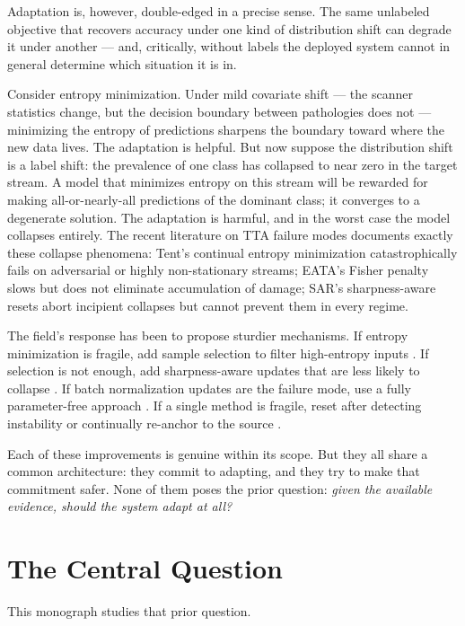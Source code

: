 Adaptation is, however, double-edged in a precise sense.
The same unlabeled objective that recovers accuracy under one kind of
distribution shift can degrade it under another --- and, critically, without
labels the deployed system cannot in general determine which situation it is in.

Consider entropy minimization.
Under mild covariate shift --- the scanner statistics change, but the
decision boundary between pathologies does not --- minimizing the entropy of
predictions sharpens the boundary toward where the new data lives.
The adaptation is helpful.
But now suppose the distribution shift is a label shift: the prevalence of
one class has collapsed to near zero in the target stream.
A model that minimizes entropy on this stream will be rewarded for making
all-or-nearly-all predictions of the dominant class; it converges to a
degenerate solution.
The adaptation is harmful, and in the worst case the model collapses
entirely.
The recent literature on TTA failure modes \cite{zhao2023pitfalls,
press2023rdumb, niu2023sar} documents exactly these collapse phenomena:
Tent's continual entropy minimization catastrophically fails on adversarial
or highly non-stationary streams; EATA's Fisher penalty slows but does not
eliminate accumulation of damage; SAR's sharpness-aware resets abort
incipient collapses but cannot prevent them in every regime.

The field's response has been to propose sturdier mechanisms.
If entropy minimization is fragile, add sample selection to filter
high-entropy inputs \cite{niu2022eata}.
If selection is not enough, add sharpness-aware updates that are less
likely to collapse \cite{niu2023sar}.
If batch normalization updates are the failure mode, use a fully
parameter-free approach \cite{boudiaf2022lame}.
If a single method is fragile, reset after detecting instability
\cite{niu2023sar} or continually re-anchor to the source
\cite{wang2022cotta}.

Each of these improvements is genuine within its scope.
But they all share a common architecture: they commit to adapting, and they
try to make that commitment safer.
None of them poses the prior question: \emph{given the available evidence,
should the system adapt at all?}

\section{The Central Question}\label{sec:intro-question}

This monograph studies that prior question.

